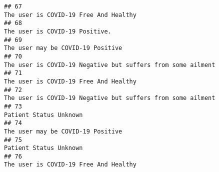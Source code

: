 \documentclass[
]{article}
\begin{document}
\begin{verbatim}
## 67                                                                                                                                                                                                                               The user is COVID-19 Free And Healthy
## 68                                                                                                                                                                                                                                      The user is COVID-19 Positive.
## 69                                                                                                                                                                                                                                   The user may be COVID-19 Positive
## 70                                                                                                                                                                                                         The user is COVID-19 Negative but suffers from some ailment
## 71                                                                                                                                                                                                                               The user is COVID-19 Free And Healthy
## 72                                                                                                                                                                                                         The user is COVID-19 Negative but suffers from some ailment
## 73                                                                                                                                                                                                                                              Patient Status Unknown
## 74                                                                                                                                                                                                                                   The user may be COVID-19 Positive
## 75                                                                                                                                                                                                                                              Patient Status Unknown
## 76                                                                                                                                                                                                                               The user is COVID-19 Free And Healthy

\end{verbatim}
\end{document}
